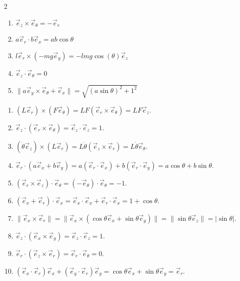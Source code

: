 \begin{sol}
\begin{multicols}{2}
\begin{enumerate}[label=\alph*), start=4]
    \item $\Vec{e}_z\times\Vec{e}_\theta=-\vec{e}_r$
    \item $a\Vec{e}_r\cdot b\Vec{e}_x=ab\cos\theta$
    \item $l\Vec{e}_r\times(-mg\Vec{e}_y)=-lmg\cos(\theta)\vec{e}_z$
    \item $\Vec{e}_z\cdot\Vec{e}_\theta=0$
    \item $\|a\Vec{e}_y\times\Vec{e}_\theta+\Vec{e}_x\|=\sqrt{(a\sin \theta)^2+1^2}$
    
\end{enumerate}
\end{multicols}
\end{sol}



\begin{sol}
\begin{enumerate}
    \item $(L\vec{e}_r) \times (F\vec{e}_\theta) = LF(\vec{e}_r \times \vec{e}_\theta) = LF\vec{e}_z$.
    \item $\vec{e}_z \cdot (\vec{e}_r \times \vec{e}_\theta) = \vec{e}_z \cdot \vec{e}_z = 1$.
    \item $(\dot{\theta}\vec{e}_z) \times (L\vec{e}_r) = L\dot{\theta}(\vec{e}_z \times \vec{e}_r) = L\dot{\theta}\vec{e}_\theta$.
    \item $\vec{e}_r \cdot (a\vec{e}_x + b\vec{e}_y) = a(\vec{e}_r \cdot \vec{e}_x) + b(\vec{e}_r \cdot \vec{e}_y) = a\cos\theta + b\sin\theta$.
    \item $(\vec{e}_r \times \vec{e}_z) \cdot \vec{e}_\theta = (-\vec{e}_\theta) \cdot \vec{e}_\theta = -1$.
    \item $(\vec{e}_x + \vec{e}_r) \cdot \vec{e}_x = \vec{e}_x \cdot \vec{e}_x + \vec{e}_r \cdot \vec{e}_x = 1 + \cos\theta$.
    \item $\| \vec{e}_x \times \vec{e}_r \| = \| \vec{e}_x \times (\cos\theta\vec{e}_x + \sin\theta\vec{e}_y) \| = \| \sin\theta\vec{e}_z \| = |\sin\theta|$.
    \item $\vec{e}_z \cdot (\vec{e}_x \times \vec{e}_y) = \vec{e}_z \cdot \vec{e}_z = 1$.
    \item $\vec{e}_r \cdot (\vec{e}_z \times \vec{e}_r) = \vec{e}_r \cdot \vec{e}_\theta = 0$.
    \item $(\vec{e}_x \cdot \vec{e}_r) \vec{e}_x + (\vec{e}_y \cdot \vec{e}_r) \vec{e}_y = \cos\theta\vec{e}_x + \sin\theta\vec{e}_y = \vec{e}_r$.
\end{enumerate}
\end{sol}

